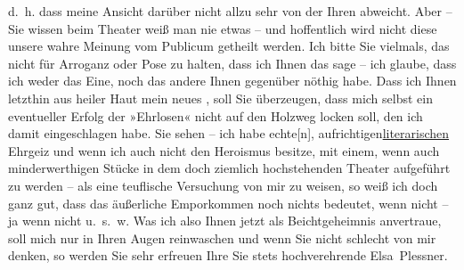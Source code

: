           d. h. dass meine Ansicht darüber nicht allzu sehr von der Ihren abweicht. Aber – Sie
          wissen beim Theater weiß man nie etwas – und hoffentlich wird nicht diese unsere wahre
          Meinung vom Publicum getheilt werden. Ich bitte Sie vielmals, das nicht für Arroganz oder
          Pose zu halten, dass ich Ihnen das sage – ich glaube, dass ich weder das Eine, noch das
          andere Ihnen gegenüber {\pb}nöthig habe. Dass ich Ihnen letzthin
          aus heiler Haut mein neues \label{K_L03725-6v}\label{K_L03725-6}, soll Sie
          überzeugen, dass mich selbst ein eventueller Erfolg der »Ehrlosen« nicht auf den Holzweg locken soll, den ich damit eingeschlagen habe. Sie
          sehen – ich habe echte{[}n{]}, aufrichtige\introOben{}n\introOben{}{ }\uline{literarischen} Ehrgeiz und wenn ich auch nicht den
          Heroismus besitze, mit einem, wenn auch minderwerthigen Stücke in dem doch ziemlich hochstehenden Theater aufgeführt zu werden – als eine teuflische
          Versuchung von mir zu {\pb}weisen, so weiß ich doch ganz gut, dass
          das äußerliche Emporkommen noch nichts bedeutet, wenn nicht – ja wenn nicht u. s. w. Was ich also Ihnen jetzt als Beichtgeheimnis anvertraue, soll mich nur in Ihren Augen
          reinwaschen und wenn Sie nicht schlecht von mir denken, so werden Sie sehr erfreuen Ihre
          Sie stets hochverehrende\pend
           \pstart \spacefill\mbox{Elsa Plessner.}\pend{}\endnumbering{}  \newcommand{\dateiname}{L03725}\newcommand{\titel}{Elsa Plessner an Arthur Schnitzler, 26. 2. 1900}\newcommand{\editorInnen}{Selma Jahnke und Martin Anton Müller}
